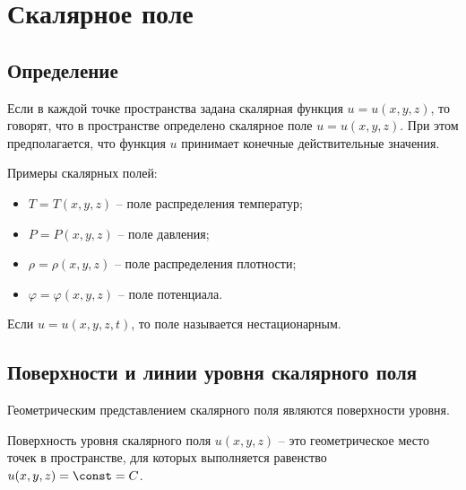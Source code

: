 \section{Скалярное поле}

\subsection{Определение}

	\begin{definition}
	Если в каждой точке пространства задана скалярная функция \( u = u(x, y, z) \), то говорят, что в пространстве определено скалярное поле \( u = u(x, y, z) \). При этом предполагается, что функция \( u \) принимает конечные действительные значения.
	\end{definition}
	
	Примеры скалярных полей:
	\begin{itemize}
	\item \( T = T(x, y, z) \) -- поле распределения температур;
	\item \( P = P(x, y, z) \) -- поле давления;
	\item \( \rho = \rho(x, y, z) \) -- поле распределения плотности;
	\item \( \varphi = \varphi(x, y, z) \) -- поле потенциала.
	\end{itemize}
	
	Если \( u = u(x, y, z, t) \), то поле называется нестационарным.

\subsection{Поверхности и линии уровня скалярного поля}

    Геометрическим представлением скалярного поля являются поверхности уровня.

    \begin{definition}
        Поверхность уровня скалярного поля \( u(x,y,z) \) -- это геометрическое место точек в пространстве, для которых выполняется равенство \( u(x,y,z) = \const = C \).
    \end{definition}

